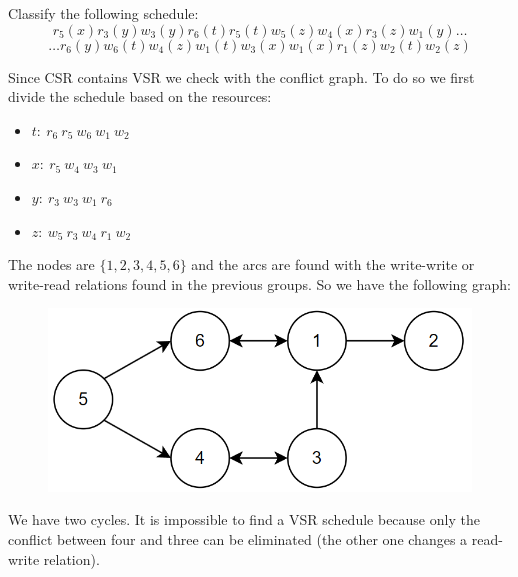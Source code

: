 \documentclass[12pt, a4paper]{report}
\newtheorem[style=M,bodystyle=\normalfont]{theorem}{Theorem}
\newtheorem[style=M,bodystyle=\normalfont]{corollary}{Corollary}
\newtheorem[style=M,bodystyle=\normalfont]{lemma}{Lemma}
\newtheorem[style=M,bodystyle=\normalfont]{definition}{Definition}
\begin{document}
    \begin{Exercise}[label=6]
        Classify the following schedule: 
        \[r_5(x) r_3(y) w_3(y) r_6(t) r_5(t) w_5(z) w_4(x) r_3(z) w_1(y) \dots\]
        \[\dots r_6(y) w_6(t) w_4(z) w_1(t) w_3(x) w_1(x) r_1(z) w_2(t) w_2(z)\]
    \end{Exercise}
    \begin{Answer}[ref=6]
        Since CSR contains VSR we check with the conflict graph. To do so we first divide the schedule based on the resources: 
        \begin{itemize}
            \item $t: \: r_6 \: r_5 \: w_6 \: w_1 \: w_2$
            \item $x: \: r_5 \: w_4 \: w_3 \: w_1$
            \item $y: \: r_3 \: w_3 \: w_1 \: r_6$
            \item $z: \: w_5 \: r_3 \: w_4 \: r_1 \: w_2$
        \end{itemize}
        The nodes are $\{1,2,3,4,5,6\}$ and the arcs are found with the write-write or write-read relations found in the previous groups. So we have the following graph:
        \begin{figure}[H]
            \centering
            \includegraphics[width=0.5\linewidth]{images/conflictgraph3.png}
        \end{figure}
        We have two cycles. It is impossible to find a VSR schedule because only the conflict between four and three can be eliminated (the other one changes a read-write relation).
    \end{Answer}

    \newpage
\end{document}
